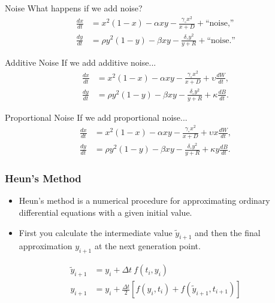 \begin{frame}{Noise}
		What happens if we add noise?
	\begin{align*}
		\frac{dx}{dt} &= x^2 (1-x) - \alpha xy - \frac{\gamma_\circ x^2}{x+D} + \text{``noise,''} \\
    \frac{dy}{dt} &= \rho y^2 (1-y) - \beta xy -\frac{\delta_\circ y^2}{y+R}+ \text{``noise.''}
	\end{align*}
\end{frame}

\begin{frame}{Additive Noise}
		If we add additive noise... 
	\begin{align*}
		\frac{dx}{dt} &= x^2 (1-x) - \alpha xy - \frac{\gamma_\circ x^2}{x+D} + \upsilon \frac{dW}{dt}, \\
    \frac{dy}{dt} &= \rho y^2 (1-y) - \beta xy -\frac{\delta_\circ y^2}{y+R}+ \kappa \frac{dB}{dt}.
	\end{align*}
\end{frame}

\begin{frame}{Proportional Noise}
		If we add proportional noise... 
	\begin{align*}
		\frac{dx}{dt} &= x^2 (1-x) - \alpha xy - \frac{\gamma_\circ x^2}{x+D} + \upsilon x \frac{dW}{dt}, \\
    \frac{dy}{dt} &= \rho y^2 (1-y) - \beta xy -\frac{\delta_\circ y^2}{y+R}+ \kappa y \frac{dB}{dt}.
	\end{align*}
\end{frame}




\begin{frame}
\frametitle{Heun's Method}
\begin{itemize}
\item Heun's method is a numerical procedure for approximating ordinary differential equations with a given initial value.
\item First you calculate the intermediate value $\tilde{y}_{i+1}$ and then the final approximation $y_{i+1}$ at the next generation point.
\end{itemize}

\begin{align*}
	\tilde{y}_{i+1} &= y_i + \Delta t \ f(t_i, y_i) \\
	y_{i+1} &= y_i + \frac{\Delta t}{2} \left[f(y_i,t_i) + f(\tilde{y}_{i+1}, t_{i+1})\right]
\end{align*}
\end{frame}


